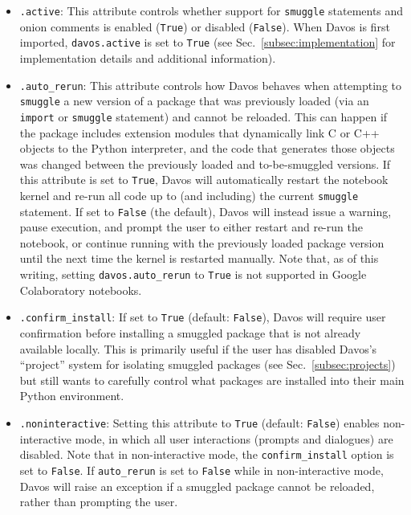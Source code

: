 \documentclass[preprint,12pt,a4paper]{elsarticle}
\begin{document}
\begin{itemize}
\item \texttt{.active}: This attribute controls whether support for \texttt{smuggle}
  statements and onion comments is enabled (\texttt{True}) or
  disabled (\texttt{False}).  When Davos is first imported,
  \texttt{davos.active} is set to \texttt{True} (see Sec.~\ref{subsec:implementation} for implementation details and additional information).

\item \texttt{.auto\_rerun}: This attribute controls how
  Davos behaves when attempting to \texttt{smuggle} a new
  version of a package that was previously loaded (via an \texttt{import} or \texttt{smuggle} statement) and cannot be
  reloaded. This can happen if the package includes extension modules
  that dynamically link C or C++ objects to the Python interpreter,
  and the code that generates those objects was changed between the
  previously loaded and to-be-smuggled versions.  If this attribute
  is set to \texttt{True}, Davos will automatically restart
  the notebook kernel and re-run all code up to (and including) the
  current \texttt{smuggle} statement. If set to \texttt{False} (the default),
  Davos will instead issue a warning, pause execution, and
  prompt the user to either restart and re-run the notebook, or
  continue running with the previously loaded package version until
  the next time the kernel is restarted manually.  Note that, as of
  this writing, setting \texttt{davos.auto\_rerun} to \texttt{True} is not
  supported in Google Colaboratory notebooks.

\item \texttt{.confirm\_install}: If set to \texttt{True} (default:
  \texttt{False}), Davos will require user confirmation
  before installing a smuggled package that is not already
  available locally. This is primarily useful if the user has disabled
  Davos's ``project'' system for isolating smuggled packages (see
  Sec.~\ref{subsec:projects}) but still wants to carefully control what
  packages are installed into their main Python environment.

\item \texttt{.noninteractive}: Setting this attribute to
  \texttt{True} (default: \texttt{False}) enables non-in\-ter\-act\-ive
  mode, in which all user interactions (prompts and dialogues) are
  disabled. Note that in non-interactive mode, the
  \texttt{confirm\_install} option is set to \texttt{False}.  If
  \texttt{auto\_rerun} is set to \texttt{False} while in non-interactive
  mode, Davos will raise an exception if a smuggled package
  cannot be reloaded, rather than prompting the user.


\end{itemize}
\end{document}
